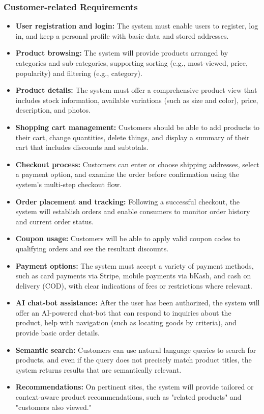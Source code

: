 \subsubsection*{Customer-related Requirements}
\begin{itemize}
  \item \textbf{User registration and login:} The system must enable users to register, log in, and keep a personal profile with basic data and stored addresses.
  \item \textbf{Product browsing:} The system will provide products arranged by categories and sub-categories, supporting sorting (e.g., most-viewed, price, popularity) and filtering (e.g., category).
  \item \textbf{Product details:} The system must offer a comprehensive product view that includes stock information, available variations (such as size and color), price, description, and photos.
  \item \textbf{Shopping cart management:} Customers should be able to add products to their cart, change quantities, delete things, and display a summary of their cart that includes discounts and subtotals.
  \item \textbf{Checkout process:} Customers can enter or choose shipping addresses, select a payment option, and examine the order before confirmation using the system's multi-step checkout flow.
  \item \textbf{Order placement and tracking:} Following a successful checkout, the system will establish orders and enable consumers to monitor order history and current order status.
  \item \textbf{Coupon usage:} Customers will be able to apply valid coupon codes to qualifying orders and see the resultant discounts.
  \item \textbf{Payment options:} The system must accept a variety of payment methods, such as card payments via Stripe, mobile payments via bKash, and cash on delivery (COD), with clear indications of fees or restrictions where relevant.
  \item \textbf{AI chat-bot assistance:} After the user has been authorized, the system will offer an AI-powered chat-bot that can respond to inquiries about the product, help with navigation (such as locating goods by criteria), and provide basic order details.
  \item \textbf{Semantic search:} Customers can use natural language queries to search for products, and even if the query does not precisely match product titles, the system returns results that are semantically relevant.
  \item \textbf{Recommendations:} On pertinent sites, the system will provide tailored or context-aware product recommendations, such as "related products" and "customers also viewed."
\end{itemize}

